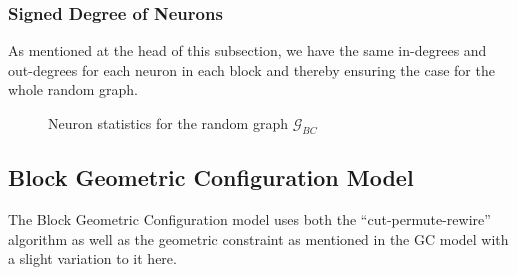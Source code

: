 \subsubsection{Signed Degree of Neurons}
As mentioned at the head of this subsection, we have the same in-degrees and out-degrees for each neuron in each block and thereby ensuring the case for the whole random graph. \begin{figure}[H]%
    \centering
    \captionsetup{justification=centering}
    \qquad
    \caption{Neuron statistics for the random graph $\mathcal{G}_{BC}$}%
    \label{fig:example}%
\end{figure}

\newpage

\subsection{Block Geometric Configuration Model}
The Block Geometric Configuration model uses both the ``cut-permute-rewire'' \cite{WattsStrogatz1998} algorithm as well as the geometric constraint as mentioned in the GC model with a slight variation to it here.
